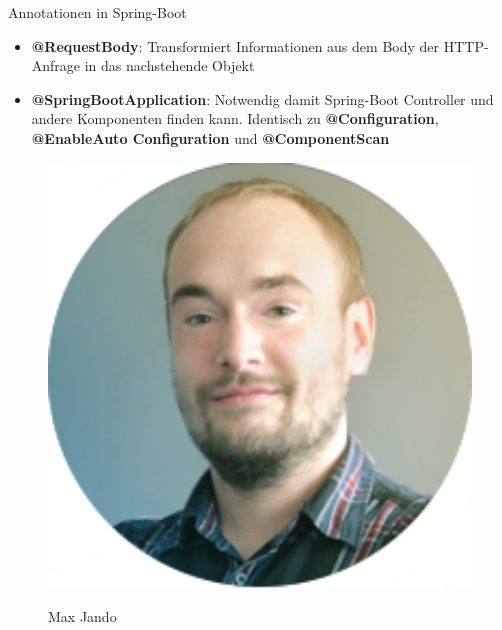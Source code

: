 \documentclass[final]{beamer}
\newlength{\onecolwid}
\begin{document}
\begin{frame}
\begin{columns}[t]
\begin{column}{\onecolwid}
\begin{block}{Annotationen in Spring-Boot}
\begin{itemize}
\item \textcolor{ui-red}{\textbf{@RequestBody}}: Transformiert Informationen aus dem Body der HTTP-Anfrage in das nachstehende Objekt
\item \textcolor{ui-red}{\textbf{@SpringBootApplication}}: Notwendig damit Spring-Boot Controller und andere Komponenten finden kann. Identisch zu \textcolor{ui-red}{\textbf{@Configuration}}, \textcolor{ui-red}{\textbf{@EnableAuto Configuration}} und \textcolor{ui-red}{\textbf{@ComponentScan}}


\end{itemize}

\begin{figure}
\begin{minipage}[t]{0.40\textwidth}\vspace{0pt} 
\includegraphics[width=1.0\textwidth]{maxjando} 
\begin{center}
	Max Jando
\end{center}
\end{minipage}\hfill%
\begin{minipage}[t]{0.40\textwidth}\vspace{0pt} 

\end{minipage}
\end{figure}
\end{block}
\end{column}
\end{columns}
\end{frame}
\end{document}
